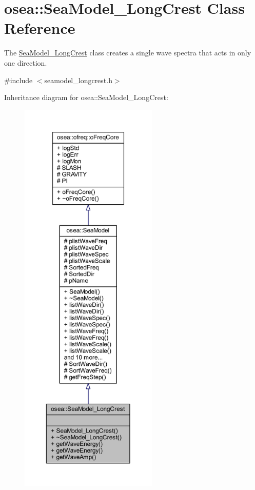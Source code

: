 \hypertarget{classosea_1_1_sea_model___long_crest}{\section{osea\-:\-:Sea\-Model\-\_\-\-Long\-Crest Class Reference}
\label{classosea_1_1_sea_model___long_crest}
}


The \hyperlink{classosea_1_1_sea_model___long_crest}{Sea\-Model\-\_\-\-Long\-Crest} class creates a single wave spectra that acts in only one direction.  




{\ttfamily \#include $<$seamodel\-\_\-longcrest.\-h$>$}



Inheritance diagram for osea\-:\-:Sea\-Model\-\_\-\-Long\-Crest\-:
\nopagebreak
\begin{figure}[H]
\begin{center}
\leavevmode
\includegraphics[height=550pt]{classosea_1_1_sea_model___long_crest__inherit__graph}
\end{center}
\end{figure}
